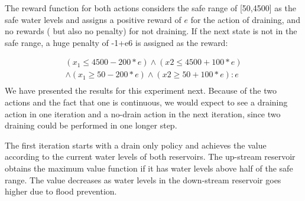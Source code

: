 The reward function for both actions considers the safe range of [50,4500] as the safe water levels and assigns a positive reward of $e$ for the action of draining, and no rewards ( but also no penalty) for not draining. If the next state is not in the safe range, a huge penalty of -1+e6 is assigned as the reward:

{\footnotesize
\begin{align*}
(x_1\leq 4500 - 200 * e) \wedge (x2 \leq 4500 +100 *e) \\
\wedge (x_1\geq 50 - 200 * e) \wedge (x2 \geq 50 +100 *e) : e \\
\end{align*}
}
We have presented the results for this experiment next. Because of the two actions and the fact that one is continuous, we would expect to see a draining action in one iteration and a no-drain action in the next iteration, since two  draining could be performed in one longer step.

The first iteration starts with a drain only policy and achieves the value according to the current water levels of both reservoirs. The up-stream reservoir obtains the maximum value function if it has water levels above half of the safe range. The value decreases as water levels in the down-stream reservoir goes higher due to flood prevention. 

